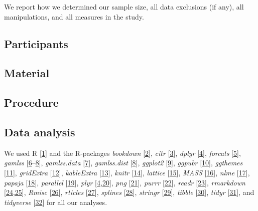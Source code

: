 \documentclass[10pt,letterpaper]{article}
\begin{document}
We report how we determined our sample size, all data exclusions (if
any), all manipulations, and all measures in the study.

\hypertarget{participants}{%
\subsection{Participants}\label{participants}}

\hypertarget{material}{%
\subsection{Material}\label{material}}

\hypertarget{procedure}{%
\subsection{Procedure}\label{procedure}}

\hypertarget{data-analysis}{%
\subsection{Data analysis}\label{data-analysis}}

We used R {[}\protect\hyperlink{ref-R-base}{1}{]} and the R-packages
\emph{bookdown} {[}\protect\hyperlink{ref-R-bookdown}{2}{]}, \emph{citr}
{[}\protect\hyperlink{ref-R-citr}{3}{]}, \emph{dplyr}
{[}\protect\hyperlink{ref-R-dplyr}{4}{]}, \emph{forcats}
{[}\protect\hyperlink{ref-R-forcats}{5}{]}, \emph{gamlss}
{[}\protect\hyperlink{ref-R-gamlss}{6}--\protect\hyperlink{ref-R-gamlss.dist}{8}{]},
\emph{gamlss.data} {[}\protect\hyperlink{ref-R-gamlss.data}{7}{]},
\emph{gamlss.dist} {[}\protect\hyperlink{ref-R-gamlss.dist}{8}{]},
\emph{ggplot2} {[}\protect\hyperlink{ref-R-ggplot2}{9}{]}, \emph{ggpubr}
{[}\protect\hyperlink{ref-R-ggpubr}{10}{]}, \emph{ggthemes}
{[}\protect\hyperlink{ref-R-ggthemes}{11}{]}, \emph{gridExtra}
{[}\protect\hyperlink{ref-R-gridExtra}{12}{]}, \emph{kableExtra}
{[}\protect\hyperlink{ref-R-kableExtra}{13}{]}, \emph{knitr}
{[}\protect\hyperlink{ref-R-knitr}{14}{]}, \emph{lattice}
{[}\protect\hyperlink{ref-R-lattice}{15}{]}, \emph{MASS}
{[}\protect\hyperlink{ref-R-MASS}{16}{]}, \emph{nlme}
{[}\protect\hyperlink{ref-R-nlme}{17}{]}, \emph{papaja}
{[}\protect\hyperlink{ref-R-papaja}{18}{]}, \emph{parallel}
{[}\protect\hyperlink{ref-R-parallel}{19}{]}, \emph{plyr}
{[}\protect\hyperlink{ref-R-dplyr}{4},\protect\hyperlink{ref-R-plyr}{20}{]},
\emph{png} {[}\protect\hyperlink{ref-R-png}{21}{]}, \emph{purrr}
{[}\protect\hyperlink{ref-R-purrr}{22}{]}, \emph{readr}
{[}\protect\hyperlink{ref-R-readr}{23}{]}, \emph{rmarkdown}
{[}\protect\hyperlink{ref-R-rmarkdown_a}{24},\protect\hyperlink{ref-R-rmarkdown_b}{25}{]},
\emph{Rmisc} {[}\protect\hyperlink{ref-R-Rmisc}{26}{]}, \emph{rticles}
{[}\protect\hyperlink{ref-R-rticles}{27}{]}, \emph{splines}
{[}\protect\hyperlink{ref-R-splines}{28}{]}, \emph{stringr}
{[}\protect\hyperlink{ref-R-stringr}{29}{]}, \emph{tibble}
{[}\protect\hyperlink{ref-R-tibble}{30}{]}, \emph{tidyr}
{[}\protect\hyperlink{ref-R-tidyr}{31}{]}, and \emph{tidyverse}
{[}\protect\hyperlink{ref-R-tidyverse}{32}{]} for all our analyses.
\end{document}
